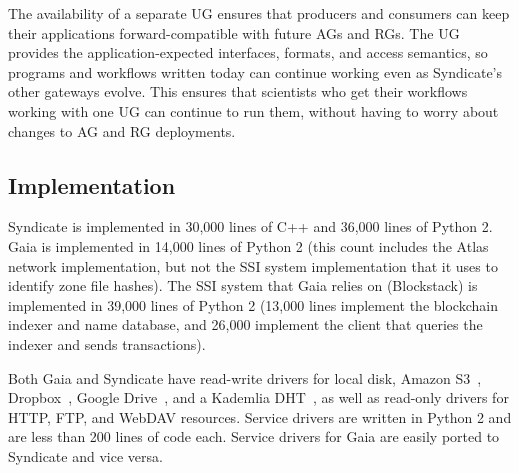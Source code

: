 The availability of a separate UG ensures that producers and consumers can keep
their applications forward-compatible with future AGs and RGs.  The UG provides
the application-expected interfaces, formats, and access semantics, so
programs and workflows written today can continue working even as Syndicate's
other gateways evolve.  This ensures that scientists who get their workflows
working with one UG can continue to run them, without having to worry about
changes to AG and RG deployments.

\subsection{Implementation}

Syndicate is implemented in 30,000 lines of C++ and 36,000 lines of Python 2.
Gaia is implemented in 14,000 lines of Python 2 (this count includes the Atlas
network implementation, but not the SSI system implementation that it uses to
identify zone file hashes).  The SSI system that Gaia relies on (Blockstack) is
implemented in 39,000 lines of Python 2 (13,000 lines implement the
blockchain indexer and name database, and 26,000 implement the client that
queries the indexer and sends transactions).

Both Gaia and Syndicate have read-write drivers for local disk, Amazon S3~\cite{s3}, 
Dropbox~\cite{dropbox}, Google Drive~\cite{gdrive}, and a Kademlia
DHT~\cite{kademlia}, as well as read-only drivers for HTTP, FTP, and WebDAV
resources.  Service drivers are written in Python 2 and are less than 200 lines of code
each.  Service drivers for Gaia are easily ported to Syndicate and vice versa.


